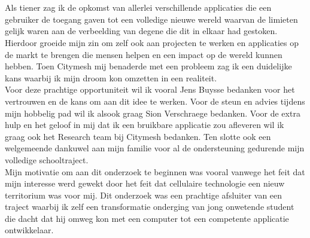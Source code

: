 
\chapter*{}%
\label{ch:voorwoord}


Als tiener zag ik de opkomst van allerlei verschillende applicaties die een gebruiker de toegang gaven tot een volledige nieuwe wereld waarvan de limieten gelijk waren aan de verbeelding van degene die dit in elkaar had gestoken. Hierdoor groeide mijn zin om zelf ook aan projecten te werken en applicaties op de markt te brengen die mensen helpen en een impact op de wereld kunnen hebben. Toen Citymesh mij benaderde met een probleem zag ik een duidelijke kans waarbij ik mijn droom kon omzetten in een realiteit. \\

Voor deze prachtige opportuniteit wil ik vooral Jens Buysse bedanken voor het vertrouwen en de kans om aan dit idee te werken. Voor de steun en advies tijdens mijn hobbelig pad wil ik alsook graag Sion Verschraege bedanken. Voor de extra hulp en het geloof in mij dat ik een bruikbare applicatie zou afleveren wil ik graag ook het Research team bij Citymesh bedanken. Ten slotte ook een welgemeende dankuwel aan mijn familie voor al de ondersteuning gedurende mijn volledige schooltraject. \\

Mijn motivatie om aan dit onderzoek te beginnen was vooral vanwege het feit dat mijn interesse werd gewekt door het feit dat cellulaire technologie een nieuw territorium was voor mij. Dit onderzoek was een prachtige afsluiter van een traject waarbij ik zelf een transformatie onderging van jong onwetende student die dacht dat hij omweg kon met een computer tot een competente applicatie ontwikkelaar. 